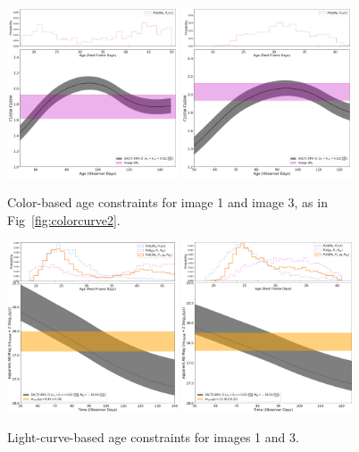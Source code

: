 \documentclass[twocolumn]{aastex63}
\begin{document}
\begin{figure}
    \centering
    \includegraphics[width=0.45\textwidth]{Images/colorcurve_image1.pdf}
    \includegraphics[width=0.45\textwidth]{Images/colorcurve_image3.pdf}
    \caption{Color-based age constraints for \SNABC image 1 and image 3, as in Fig~\ref{fig:colorcurve2}.}
    \label{fig:colorcurve13}
\end{figure}

\begin{figure}
    \centering
    \includegraphics[width=0.45\textwidth]{Images/lightcurve_image1.pdf}
    \includegraphics[width=0.45\textwidth]{Images/lightcurve_image3.pdf}
    \caption{Light-curve-based age constraints for \SNABC images 1 and 3.}
    \label{fig:lightcurve13}
\end{figure}
\end{document}
